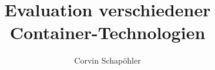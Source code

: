 

\title{Evaluation verschiedener Container-Technologien}
\author{Corvin Schapöhler}


	
	
	
	
	\frontmatter
	\pagestyle{front}
	
%	
	

	\setcounter{tocdepth}{1}
	\tableofcontents

	\mainmatter
	\pagestyle{main}
	
	
	
	\backmatter
	\pagestyle{back}
	
	

